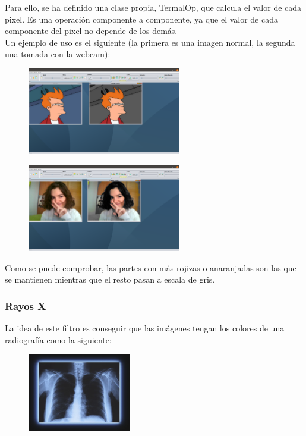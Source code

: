 \documentclass[11pt,a4paper]{article}
\begin{document}
Para ello, se ha definido una clase propia, TermalOp, que calcula el valor de cada pixel. Es una operación componente a componente, ya que el valor de cada componente del pixel no depende de los demás.\\

Un ejemplo de uso es el siguiente (la primera es una imagen normal, la segunda una tomada con la webcam):

\begin{figure}[H]
\centering
	\includegraphics[width=0.6\textwidth]{img/termal.png}
\end{figure}

\begin{figure}[H]
\centering
	\includegraphics[width=0.6\textwidth]{img/thermal.png}
\end{figure}

Como se puede comprobar, las partes con más rojizas o anaranjadas son las que se mantienen mientras que el resto pasan a escala de gris.

\subsubsection{Rayos X}
La idea de este filtro es conseguir que las imágenes tengan los colores de una radiografía como la siguiente:

\begin{figure}[H]
\centering
	\includegraphics[width=0.4\textwidth]{img/ejemplo.png}
\end{figure}
\end{document}
